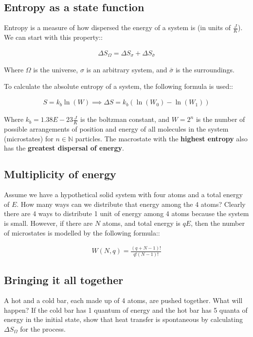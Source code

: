 \documentclass[12pt]{book}
\begin{document}
\subsection*{Entropy as a state function}

Entropy is a measure of how dispersed the energy of a system is (in units of $\frac{J}{K}$). We can start with this property::

\begin{align*}
    \Delta S_{\Omega}=\Delta S_{\sigma}+\Delta S_{\bar{\sigma}}
\end{align*}

Where $\Omega$ is the universe, $\sigma$ is an arbitrary system, and $\bar{\sigma}$ is the surroundings.

To calculate the absolute entropy of a system, the following formula is used::

\begin{align*}
    S=k_b\ln(W)\implies \Delta S=k_b(\ln(W_0)-\ln(W_1))
\end{align*}

Where $k_b=1.38E-23 \frac{J}{K}$ is the boltzman constant, and $W=2^n$ is the number of possible arrangements of position and energy of all molecules in the system (microstates) for $n\in \mathbb{N}$ particles. The macrostate with the \textbf{highest entropy} also has the \textbf{greatest dispersal of energy}.

\subsection*{Multiplicity of energy}

Assume we have a hypothetical solid system with four atoms and a total energy of $E$. How many ways can we distribute that energy among the 4 atoms? Clearly there are 4 ways to distribute 1 unit of energy among 4 atoms because the system is small. However, if there are $N$ atoms, and total energy is $qE$, then the number of microstates is modelled by the following formula::

\begin{align*}
    W(N,q)=\frac{(q+N-1)!}{q!(N-1)!}
\end{align*}

\subsection*{Bringing it all together}

A hot and a cold bar, each made up of 4
atoms, are pushed together. What will
happen? If the cold bar has 1 quantum of energy
and the hot bar has 5 quanta of energy in
the initial state, show that heat transfer is
spontaneous by calculating $\Delta S_{\Omega}$ for
the process.
\end{document}
